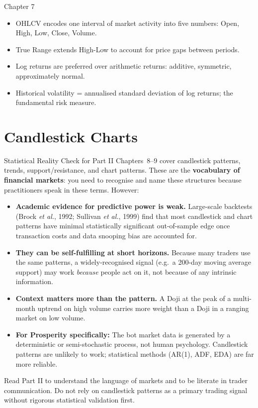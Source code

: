 \documentclass[12pt,a4paper,openany]{report}
\theoremstyle{definition}
\begin{document}
\begin{takeawaybox}{Chapter 7}
\begin{itemize}
  \item OHLCV encodes one interval of market activity into five numbers: Open, High, Low, Close, Volume.
  \item True Range extends High-Low to account for price gaps between periods.
  \item Log returns are preferred over arithmetic returns: additive, symmetric, approximately normal.
  \item Historical volatility = annualised standard deviation of log returns; the fundamental risk measure.
\end{itemize}
\end{takeawaybox}


\chapter{Candlestick Charts}

\begin{warningbox}{Statistical Reality Check for Part II}
Chapters~8--9 cover candlestick patterns, trends, support/resistance, and chart patterns. These are the \textbf{vocabulary of financial markets}: you need to recognise and name these structures because practitioners speak in these terms. However:
\begin{itemize}
  \item \textbf{Academic evidence for predictive power is weak.} Large-scale backtests (Brock \emph{et al.}, 1992; Sullivan \emph{et al.}, 1999) find that most candlestick and chart patterns have minimal statistically significant out-of-sample edge once transaction costs and data snooping bias are accounted for.
  \item \textbf{They can be self-fulfilling at short horizons.} Because many traders use the same patterns, a widely-recognised signal (e.g.\ a 200-day moving average support) may work \emph{because} people act on it, not because of any intrinsic information.
  \item \textbf{Context matters more than the pattern.} A Doji at the peak of a multi-month uptrend on high volume carries more weight than a Doji in a ranging market on low volume.
  \item \textbf{For Prosperity specifically:} The bot market data is generated by a deterministic or semi-stochastic process, not human psychology. Candlestick patterns are unlikely to work; statistical methods (AR(1), ADF, EDA) are far more reliable.
\end{itemize}
Read Part II to understand the language of markets and to be literate in trader communication. Do not rely on candlestick patterns as a primary trading signal without rigorous statistical validation first.
\end{warningbox}
\end{document}
